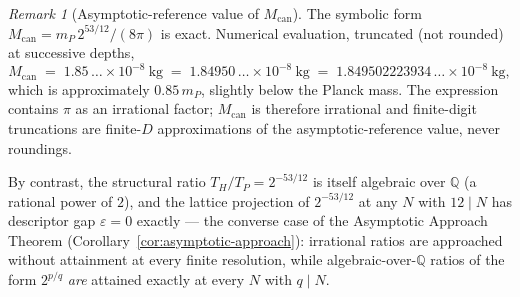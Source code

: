 \documentclass[11pt,a4paper]{article}
\theoremstyle{definition}
\theoremstyle{remark}
\newtheorem{remark}[theorem]{Remark}
\begin{document}
\begin{remark}[Asymptotic-reference value of $M_{\text{can}}$]\label{rem:canonical-asymptotic}
The symbolic form $M_{\text{can}} = m_{P}\,2^{53/12}/(8\pi)$ is exact. Numerical evaluation, truncated (not rounded) at successive depths,
\[
M_{\text{can}} \;=\; 1.85\,\ldots\times 10^{-8}~\text{kg} \;=\; 1.84950\,\ldots\times 10^{-8}~\text{kg} \;=\; 1.849502223934\,\ldots\times 10^{-8}~\text{kg},
\]
which is approximately $0.85\,m_{P}$, slightly below the Planck mass. The expression contains $\pi$ as an irrational factor; $M_{\text{can}}$ is therefore irrational and finite-digit truncations are finite-$D$ approximations of the asymptotic-reference value, never roundings.

By contrast, the structural ratio $T_{H}/T_{P} = 2^{-53/12}$ is itself algebraic over $\mathbb{Q}$ (a rational power of $2$), and the lattice projection of $2^{-53/12}$ at any $N$ with $12 \mid N$ has descriptor gap $\varepsilon = 0$ exactly --- the converse case of the Asymptotic Approach Theorem (Corollary~\ref{cor:asymptotic-approach}): irrational ratios are approached without attainment at every finite resolution, while algebraic-over-$\mathbb{Q}$ ratios of the form $2^{p/q}$ \emph{are} attained exactly at every $N$ with $q \mid N$.
\end{remark}
\end{document}
